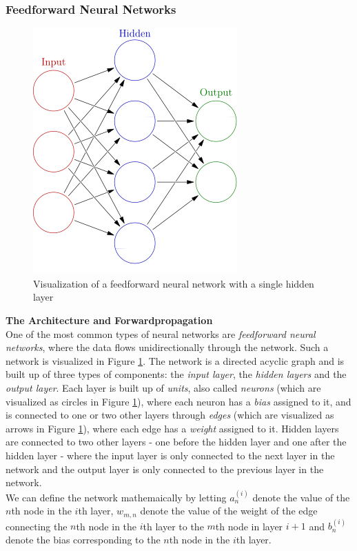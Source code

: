 \documentclass[./main.tex]{subfiles}
\begin{document}
\subsubsection{Feedforward Neural Networks} \label{subsubsec:FeedforwardNN}
\begin{figure}[htbp]
    \centering
    \includegraphics[height = 5 cm]{entities/feed_forward_nn.jpg}
    \caption{Visualization of a feedforward neural network with a single hidden layer \cite{feedforward_nn}}
    \label{feedforward_nn}
\end{figure}
\noindent \textbf{The Architecture and Forwardpropagation} \\
One of the most common types of neural networks are \textit{feedforward neural networks}, where the data flows unidirectionally through the network. Such a network is visualized in Figure \ref{feedforward_nn}. The network is a directed acyclic graph and is built up of three types of components: the \textit{input layer}, the \textit{hidden layers} and the \textit{output layer}. Each layer is built up of \textit{units}, also called \textit{neurons} (which are visualized as circles in Figure \ref{feedforward_nn}), where each neuron has a \textit{bias} assigned to it, and is connected to one or two other layers through \textit{edges} (which are visualized as arrows in Figure \ref{feedforward_nn}), where each edge has a \textit{weight} assigned to it. Hidden layers are connected to two other layers - one before the hidden layer and one after the hidden layer - where the input layer is only connected to the next layer in the network and the output layer is only connected to the previous layer in the network. \\
We can define the network mathemaically by letting $a_n ^{(i)}$ denote the value of the $n$th node in the $i$th layer, $w_{m, n}$ denote the value of the weight of the edge connecting the $n$th node in the $i$th layer to the $m$th node in layer $i + 1$ and $b_n ^{(i)}$ denote the bias corresponding to the $n$th node in the $i$th layer. \\
\end{document}
